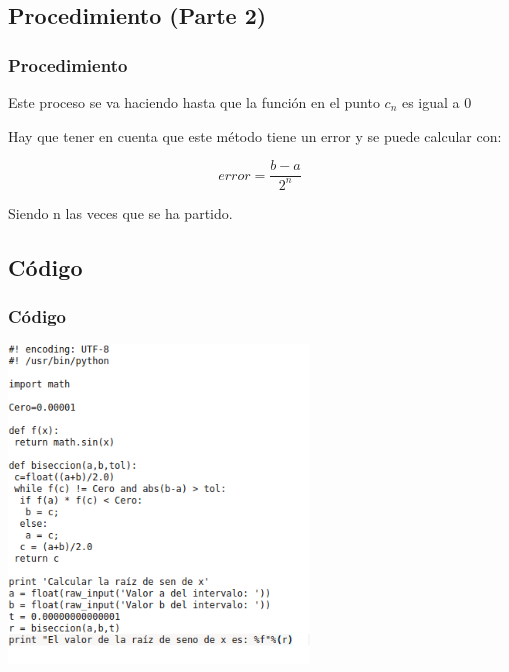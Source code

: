\documentclass{beamer}
\begin{document}

\subsection{Procedimiento (Parte 2)}
\begin{frame}
\frametitle{Procedimiento}

 \item
  Este proceso se va haciendo hasta que la función en el punto $c_n$ es igual a $0$
 \pause
 
 \item
  Hay que tener en cuenta que este método tiene un error y se puede calcular con:
  \begin{center}
   $$ error=\frac{b-a}{2^n} $$ 
  \end{center} 
  Siendo n las veces que se ha partido.
 
\end{frame}


\subsection{Código} 
\begin{frame}[fragile]

\frametitle{Código}
\begin{center}
\includegraphics[width=0.6\textwidth]{xcgc.png} 
\end{center}
\end{frame}

\end{document}
